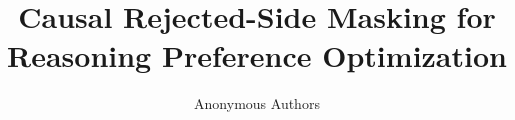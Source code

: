 \documentclass{article}
\title{Causal Rejected-Side Masking for Reasoning Preference Optimization}
\author{Anonymous Authors}
\begin{document}
\maketitle

\begin{abstract}

\end{abstract}













\appendix

\end{document}
